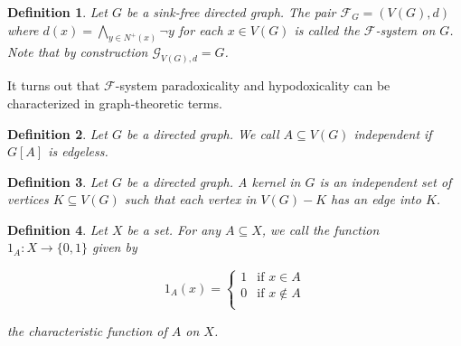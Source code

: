 \documentclass[12pt]{kluwer}
\newtheorem{defn}{Definition}
\theoremstyle{remark}
\newcommand{\fancy}[1]{\mathcal{#1}}
\def\G{\fancy{G}}
\def\F{\fancy{F}}
\def\F{\fancy{F}}
\begin{document}
\begin{defn}
Let $G$ be a sink-free directed graph.  The pair $\F_G = (V(G), d)$ where $d(x) = \bigwedge_{y \in N^+(x)} \neg y$ for each $x \in V(G)$ is called the \emph{$\F$-system} on $G$.  Note that by construction $\G_{V(G), d} = G$.
\end{defn}

It turns out that $\F$-system paradoxicality and hypodoxicality can be characterized in graph-theoretic terms.

\begin{defn}
Let $G$ be a directed graph. We call $A \subseteq V(G)$ \emph{independent} if $G[A]$ is edgeless.
\end{defn}

\begin{defn}
Let $G$ be a directed graph.  A \emph{kernel} in $G$ is an independent set of vertices $K \subseteq V(G)$ such that each vertex in $V(G) - K$ has an edge into $K$.
\end{defn}

\begin{defn}
Let $X$ be a set.  For any $A \subseteq X$, we call the function $1_A:X \rightarrow \{0,1\}$ given by

\[1_A(x) = \begin{cases}
1 & \text{if } x \in A \\
0 & \text{if } x \not \in A \\
\end{cases}\]

the \emph{characteristic function} of $A$ on $X$.
\end{defn}
\end{document}
